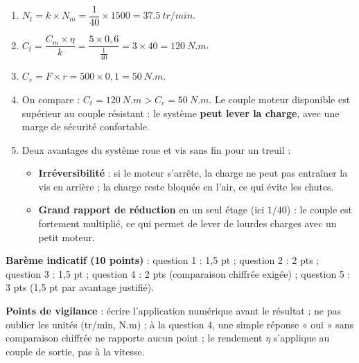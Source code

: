 \documentclass[11pt]{article}
\begin{document}
\begin{corrige}
\begin{enumerate}
\item $N_t = k \times N_m = \dfrac{1}{40} \times 1500 = \SI{37,5}{tr/min}$.
\item $C_t = \dfrac{C_m \times \eta}{k} = \dfrac{5 \times 0,6}{\frac{1}{40}} = 3 \times 40 = \SI{120}{N.m}$.
\item $C_r = F \times r = 500 \times 0,1 = \SI{50}{N.m}$.
\item On compare : $C_t = \SI{120}{N.m} > C_r = \SI{50}{N.m}$. Le couple moteur disponible est supérieur au couple résistant : le système \textbf{peut lever la charge}, avec une marge de sécurité confortable.
\item Deux avantages du système roue et vis sans fin pour un treuil :
\begin{itemize}
\item \textbf{Irréversibilité} : si le moteur s'arrête, la charge ne peut pas entraîner la vis en arrière ; la charge reste bloquée en l'air, ce qui évite les chutes.
\item \textbf{Grand rapport de réduction} en un seul étage (ici $1/40$) : le couple est fortement multiplié, ce qui permet de lever de lourdes charges avec un petit moteur.
\end{itemize}
\end{enumerate}
\textbf{Barème indicatif (10 points)} : question 1 : 1,5 pt ; question 2 : 2 pts ; question 3 : 1,5 pt ; question 4 : 2 pts (comparaison chiffrée exigée) ; question 5 : 3 pts (1,5 pt par avantage justifié).\par
\textbf{Points de vigilance} : écrire l'application numérique avant le résultat ; ne pas oublier les unités (tr/min, N.m) ; à la question 4, une simple réponse « oui » sans comparaison chiffrée ne rapporte aucun point ; le rendement $\eta$ s'applique au couple de sortie, pas à la vitesse.
\end{corrige}
\end{document}
